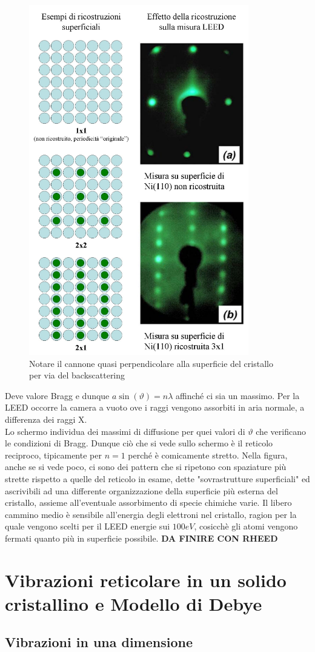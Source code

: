 \documentclass{book}
\begin{document}
        \begin{figure}[h!]
            \centering
            \includegraphics[width=0.35\linewidth]{img/LEED.png}
            \caption{Notare il cannone quasi perpendicolare alla superficie del cristallo per via del backscattering}
        \end{figure}\newpage
        Deve valore Bragg e dunque $a \sin{(\vartheta)} = n \lambda$ affinché ci sia un massimo. Per la LEED occorre la camera a vuoto ove i raggi vengono assorbiti in aria normale, a differenza dei raggi X.\\
        Lo schermo individua dei massimi di diffusione per quei valori di $\vartheta$ che verificano le condizioni di Bragg. Dunque ciò che si vede sullo schermo è il reticolo reciproco, tipicamente per $n=1$ perché è comicamente stretto. Nella figura, anche se si vede poco, ci sono dei pattern che si ripetono con spaziature più strette rispetto a quelle del reticolo in esame, dette "sovrastrutture superficiali" ed ascrivibili ad una differente organizzazione della superficie più esterna del cristallo, assieme all'eventuale assorbimento di specie chimiche varie. Il libero cammino medio è sensibile all'energia degli elettroni nel cristallo, ragion per la quale vengono scelti per il LEED energie sui $100eV$, cosicchè gli atomi vengono fermati quanto più in superficie possibile. \textbf{DA FINIRE CON RHEED}

\chapter{Vibrazioni reticolare in un solido cristallino e Modello di Debye}
    \section{Vibrazioni in una dimensione}
\end{document}
